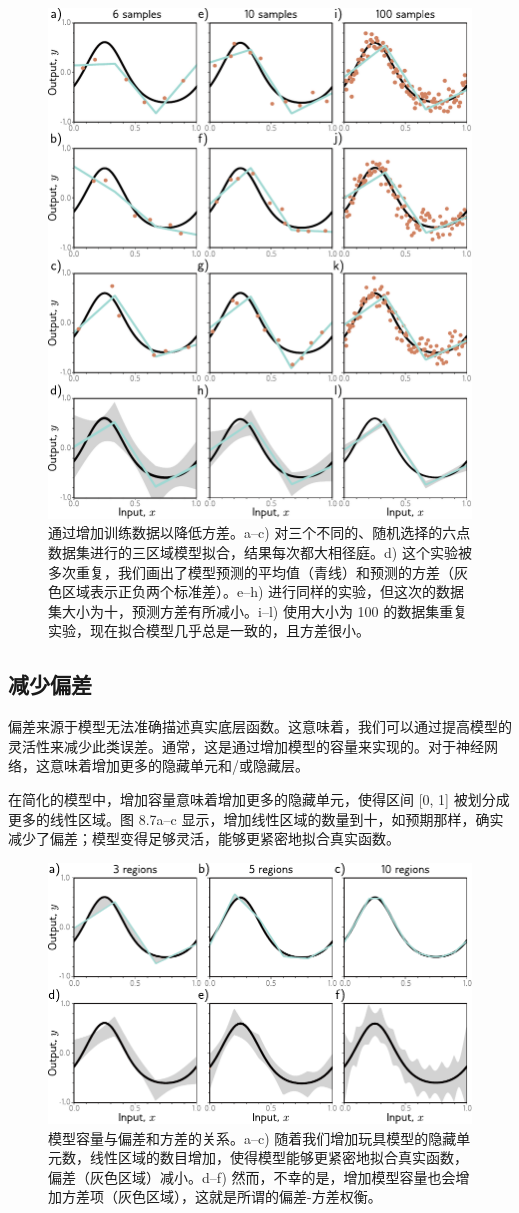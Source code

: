 \documentclass[lang=cn,newtx,10pt,scheme=chinese]{elegantbook}
\begin{document}
\begin{figure}[ht!]
\centering
\includegraphics[width=0.7\linewidth]{PDFFigures/UDLChap8PDF/PerfVariance.pdf}
\caption{通过增加训练数据以降低方差。a–c) 对三个不同的、随机选择的六点数据集进行的三区域模型拟合，结果每次都大相径庭。d) 这个实验被多次重复，我们画出了模型预测的平均值（青线）和预测的方差（灰色区域表示正负两个标准差）。e–h) 进行同样的实验，但这次的数据集大小为十，预测方差有所减小。i–l) 使用大小为 100 的数据集重复实验，现在拟合模型几乎总是一致的，且方差很小。}
\end{figure}


\subsection{减少偏差}
偏差来源于模型无法准确描述真实底层函数。这意味着，我们可以通过提高模型的灵活性来减少此类误差。通常，这是通过增加模型的容量来实现的。对于神经网络，这意味着增加更多的隐藏单元和/或隐藏层。

在简化的模型中，增加容量意味着增加更多的隐藏单元，使得区间 [0, 1] 被划分成更多的线性区域。图 8.7a–c 显示，增加线性区域的数量到十，如预期那样，确实减少了偏差；模型变得足够灵活，能够更紧密地拟合真实函数。

\begin{figure}[ht!]
\centering
\includegraphics[width=0.7\linewidth]{PDFFigures/UDLChap8PDF/PerfBias.pdf}
\caption{模型容量与偏差和方差的关系。a–c) 随着我们增加玩具模型的隐藏单元数，线性区域的数目增加，使得模型能够更紧密地拟合真实函数，偏差（灰色区域）减小。d–f) 然而，不幸的是，增加模型容量也会增加方差项（灰色区域），这就是所谓的偏差-方差权衡。}
\end{figure}
\end{document}
